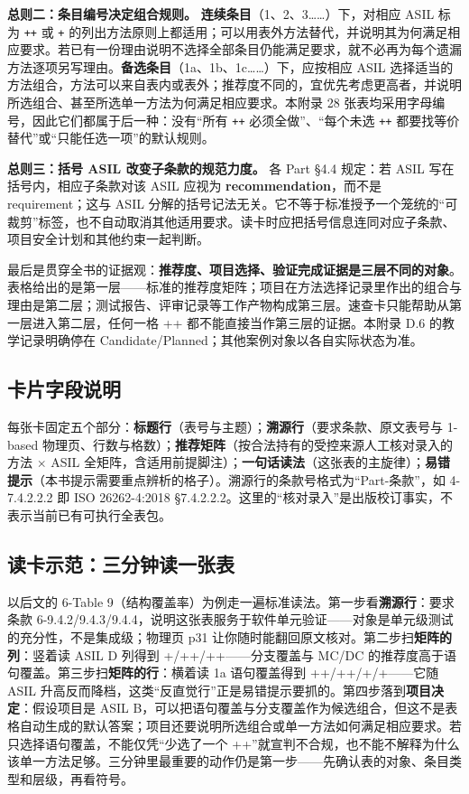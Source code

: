 \textbf{总则二：条目编号决定组合规则。} \textbf{连续条目}（1、2、3\ldots{}\ldots{}）下，对相应 ASIL 标为 \nolinkurl{++} 或 \nolinkurl{+} 的列出方法原则上都适用；可以用表外方法替代，并说明其为何满足相应要求。若已有一份理由说明不选择全部条目仍能满足要求，就不必再为每个遗漏方法逐项另写理由。\textbf{备选条目}（1a、1b、1c\ldots{}\ldots{}）下，应按相应 ASIL 选择适当的方法组合，方法可以来自表内或表外；推荐度不同的，宜优先考虑更高者，并说明所选组合、甚至所选单一方法为何满足相应要求。本附录 28 张表均采用字母编号，因此它们都属于后一种：没有“所有 \nolinkurl{++} 必须全做”、“每个未选 \nolinkurl{++} 都要找等价替代”或“只能任选一项”的默认规则。

\textbf{总则三：括号 ASIL 改变子条款的规范力度。} 各 Part §4.4 规定：若 ASIL 写在括号内，相应子条款对该 ASIL 应视为 \textbf{recommendation}，而不是 requirement；这与 ASIL 分解的括号记法无关。它不等于标准授予一个笼统的“可裁剪”标签，也不自动取消其他适用要求。读卡时应把括号信息连同对应子条款、项目安全计划和其他约束一起判断。

最后是贯穿全书的证据观：\textbf{推荐度、项目选择、验证完成证据是三层不同的对象}。表格给出的是第一层——标准的推荐度矩阵；项目在方法选择记录里作出的组合与理由是第二层；测试报告、评审记录等工作产物构成第三层。速查卡只能帮助从第一层进入第二层，任何一格 ++ 都不能直接当作第三层的证据。本附录 D.6 的教学记录明确停在 Candidate/Planned；其他案例对象以各自实际状态为准。

\subsection{卡片字段说明}

每张卡固定五个部分：\textbf{标题行}（表号与主题）；\textbf{溯源行}（要求条款、原文表号与 1-based 物理页、行数与格数）；\textbf{推荐矩阵}（按合法持有的受控来源人工核对录入的方法 \(\times\) ASIL 全矩阵，含适用前提脚注）；\textbf{一句话读法}（这张表的主旋律）；\textbf{易错提示}（本书提示需要重点辨析的格子）。溯源行的条款号格式为“Part-条款”，如 4-7.4.2.2.2 即 ISO 26262-4:2018 §7.4.2.2.2。这里的“核对录入”是出版校订事实，不表示当前已有可执行全表包。

\subsection{读卡示范：三分钟读一张表}

以后文的 6-Table 9（结构覆盖率）为例走一遍标准读法。第一步看\textbf{溯源行}：要求条款 6-9.4.2/9.4.3/9.4.4，说明这张表服务于软件单元验证——对象是单元级测试的充分性，不是集成级；物理页 p31 让你随时能翻回原文核对。第二步扫\textbf{矩阵的列}：竖着读 ASIL D 列得到 +/++/++——分支覆盖与 MC/DC 的推荐度高于语句覆盖。第三步扫\textbf{矩阵的行}：横着读 1a 语句覆盖得到 ++/++/+/+——它随 ASIL 升高反而降档，这类“反直觉行”正是易错提示要抓的。第四步落到\textbf{项目决定}：假设项目是 ASIL B，可以把语句覆盖与分支覆盖作为候选组合，但这不是表格自动生成的默认答案；项目还要说明所选组合或单一方法如何满足相应要求。若只选择语句覆盖，不能仅凭“少选了一个 ++”就宣判不合规，也不能不解释为什么该单一方法足够。三分钟里最重要的动作仍是第一步——先确认表的对象、条目类型和层级，再看符号。

